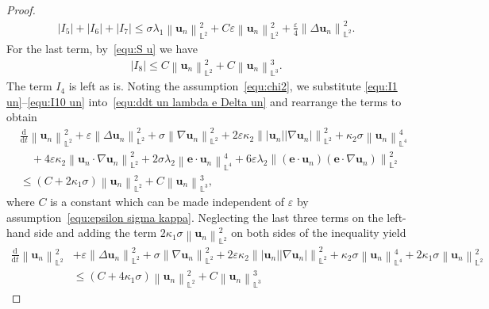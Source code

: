 \documentclass[11pt, reqno]{amsart}
\theoremstyle{definition}
\numberwithin{equation}{section}
\newcommand{\bff}{\boldsymbol}
\newcommand{\bb}{\mathbb}
\newcommand{\ddt}{\frac{\mathrm{d}}{\mathrm{d}t}}
\newcommand{\norm}[2]{\left\|{#1}\right\|_{#2}}
\newcommand{\abs}[1]{\left|{#1}\right|}
\begin{document}
\begin{proof}
	\begin{align}
		\label{equ:I5 I9 un}
		\abs{I_5}+\abs{I_6}+\abs{I_7}
		\leq
        \sigma\lambda_1 \norm{\bff{u}_n}{\bb{L}^2}^2
        +
		C\varepsilon \norm{\bff{u}_n}{\bb{L}^2}^2
		+
		\frac{\varepsilon}{4} \norm{\Delta \bff{u}_n}{\bb{L}^2}^2.
	\end{align}
	For the last term, by~\eqref{equ:S u} we have
	\begin{align}
		\label{equ:I10 un}
		\abs{I_{8}}
		\leq
		C \norm{\bff{u}_n}{\bb{L}^2}^2 + C\norm{\bff{u}_n}{\bb{L}^3}^3.
	\end{align}
    The term $I_4$ is left as is.
	Noting the assumption~\eqref{equ:chi2}, we substitute \eqref{equ:I1 un}--\eqref{equ:I10 un} into~\eqref{equ:ddt un lambda e Delta un} and rearrange the terms to obtain
        \begin{align*}
        &\ddt \norm{\bff{u}_n}{\bb{L}^2}^2
		+
		\varepsilon \norm{\Delta \bff{u}_n}{\bb{L}^2}^2
		+
		\sigma \norm{\nabla \bff{u}_n}{\bb{L}^2}^2
		+
		2\varepsilon \kappa_2 \norm{|\bff{u}_n| |\nabla \bff{u}_n|}{\bb{L}^2}^2
        +
		\kappa_2 \sigma \norm{\bff{u}_n}{\bb{L}^4}^4
        \\
        &\quad
        +
        4\varepsilon \kappa_2 \norm{\bff{u}_n \cdot \nabla \bff{u}_n}{\bb{L}^2}^2 
        +
        2\sigma\lambda_2 \norm{\bff{e}\cdot\bff{u}_n}{\bb{L}^4}^4
        +
        6\varepsilon\lambda_2 \norm{(\bff{e}\cdot \bff{u}_n)(\bff{e}\cdot \nabla \bff{u}_n)}{\bb{L}^2}^2
        \\
		&\leq
		(C+2\kappa_1 \sigma) \norm{\bff{u}_n}{\bb{L}^2}^2 + C\norm{\bff{u}_n}{\bb{L}^3}^3,
        \end{align*}
        where $C$ is a constant which can be made independent of $\varepsilon$ by assumption~\eqref{equ:epsilon sigma kappa}.
        Neglecting the last three terms on the left-hand side and adding the term $2\kappa_1 \sigma \norm{\bff{u}_n}{\bb{L}^2}^2$ on both sides of the inequality yield 
        \begin{align*}
        	\ddt \norm{\bff{u}_n}{\bb{L}^2}^2
        	&+
        	\varepsilon \norm{\Delta \bff{u}_n}{\bb{L}^2}^2
        	+
        	\sigma \norm{\nabla \bff{u}_n}{\bb{L}^2}^2
        	+
        	2\varepsilon \kappa_2 \norm{|\bff{u}_n| |\nabla \bff{u}_n|}{\bb{L}^2}^2
        	+
        	\kappa_2 \sigma \norm{\bff{u}_n}{\bb{L}^4}^4 
        	+
        	2\kappa_1 \sigma \norm{\bff{u}_n}{\bb{L}^2}^2
        	\\
        	&\leq
        	(C+4\kappa_1 \sigma) \norm{\bff{u}_n}{\bb{L}^2}^2 + C\norm{\bff{u}_n}{\bb{L}^3}^3

\end{align*}
\end{proof}
\end{document}
